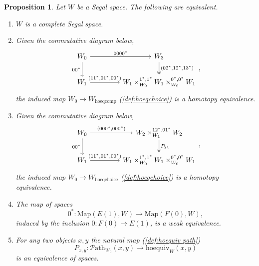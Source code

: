 \documentclass[11pt, a4paper]{amsart}
\newcommand{\Map}{\mathrm{Map}}
\newcommand{\hoequiv}{\mathrm{hoequiv}}
\newcommand{\hoeqchoice}{\mathrm{hoeqchoice}}
\newcommand{\hoeqcomp}{\mathrm{hoeqcomp}}
\newcommand{\Path}{\mathscr{P}\mathrm{ath}}
\newtheorem{proposition}[equation]{Proposition}
\theoremstyle{definition}
\theoremstyle{remark}
\numberwithin{equation}{section}
\begin{document}
\begin{proposition} \label{prop:completeness conditions}
  Let $W$ be a Segal space. The following are equivalent.
  \begin{enumerate}
   \item $W$ is a complete Segal space.
   \item Given the commutative diagram below,
   \[
   \begin{tikzcd}[column sep=1.5cm]
    W_0 \arrow[r, "0000^*"] \arrow[d, "00^*"'] & W_3 \arrow[d, "{(02^*,12^*,13^*)}", twoheadrightarrow] \\
    W_1 \arrow[r, "{(11^*,01^*,00^*)}"] & W_1 \times^{1^*,1^*}_{W_0} W_1 \times^{0^*,0^*}_{W_0} W_1
   \end{tikzcd},
   \]
   the induced map $W_0 \to W_{\hoeqcomp}$ (\cref{def:hoeqchoice}) is a homotopy equivalence.
   \item Given the commutative diagram below,
   \[
   \begin{tikzcd}[column sep=1.5cm]
    W_0 \arrow[r, "{(000^*,000^*)}"] \arrow[d, "{00^*}"'] & W_2 \times^{12^*,01^*}_{W_1} W_2 \arrow[d, "P_{21}", twoheadrightarrow] \\
    W_1 \arrow[r, "{(11^*,01^*,00^*)}"] & W_1 \times^{1^*,1^*}_{W_0} W_1 \times^{0^*,0^*}_{W_0} W_1
   \end{tikzcd},
   \]
   the induced map $W_0 \to W_{\hoeqchoice}$ (\cref{def:hoeqchoice}) is a homotopy equivalence.
   \item The map of spaces 
   \[0^*\colon \Map(E(1),W) \to \Map(F(0),W),\]
   induced by the inclusion $0\colon F(0) \to E(1)$, is a weak equivalence.
   \item For any two objects $x,y$ the natural map (\cref{def:hoequiv path})
   \[P_{x,y}\colon \Path_{W_0}(x,y) \to \hoequiv_W(x,y)\]
   is an equivalence of spaces.
  \end{enumerate}
 \end{proposition}
 
\end{document}

